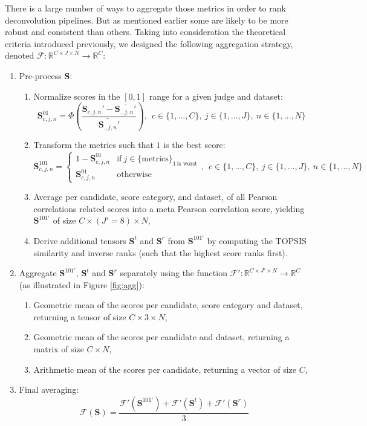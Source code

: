 \documentclass{article}
\begin{document}
There is a large number of ways to aggregate those metrics in order to rank deconvolution pipelines. 
But as mentioned earlier some are likely to be more robust and consistent than others. 
Taking into consideration the theoretical criteria introduced previously, we designed the following aggregation strategy, denoted $\mathcal{F}: \mathbb{R}^{C \times J \times N} \longrightarrow \mathbb{R}^C$:
\begin{enumerate}
    \item Pre-process $\mathbf{S}$:
    \begin{enumerate}
        \item Normalize scores in the $[0, 1]$ range for a given judge and dataset:
        $$\mathbf{S}^{01}_{c,j,n} = \Phi\left(\frac{\mathbf{S}_{c,j,n}' - \overline{\mathbf{S}_{.,j,n}'}}{\widetilde{\mathbf{S}_{.,j,n}'}}\right), ~~c \in \{1,...,C\}, ~j \in \{1,...,J\}, ~n \in \{1,...,N\}$$
        \item Transform the metrics such that $1$ is the best score:
        $$
        \mathbf{S}^{101}_{c,j,n} = 
        \begin{cases}
          1 - \mathbf{S}^{01}_{c,j,n} & \text{if} ~j \in \{\text{metrics}\}_{1 ~\text{is worst}} \\
          \mathbf{S}^{01}_{c,j,n} & \text{otherwise}
        \end{cases}
        , ~~c \in \{1,...,C\}, ~j \in \{1,...,J\}, ~n \in \{1,...,N\}
        $$
        \item Average per candidate, score category, and dataset, of all Pearson correlations related scores into a meta Pearson correlation score, yielding $\mathbf{S}^{101'}$ of size $C \times (J'=8) \times N$,
        \item Derive additional tensors $\mathbf{S}^t$ and $\mathbf{S}^r$ from $\mathbf{S}^{101'}$ by computing the TOPSIS similarity \cite{yoon_1981_topsis} and inverse ranks (such that the highest score ranks first).
    \end{enumerate}
    \item Aggregate $\mathbf{S}^{101'}$, $\mathbf{S}^t$ and $\mathbf{S}^r$ separately using the function $\mathcal{F'}: \mathbb{R}^{C \times J' \times N} \longrightarrow \mathbb{R}^C$ (as illustrated in Figure \ref{fig:agg}):
    \begin{enumerate}
        \item Geometric mean of the scores per candidate, score category and dataset, returning a tensor of size $C \times 3 \times N$,
        \item Geometric mean of the scores per candidate and dataset, returning a matrix of size $C \times N$,
        \item Arithmetic mean of the scores per candidate, returning a vector of size $C$,
    \end{enumerate}
    \item Final averaging:
    $$\mathcal{F}(\mathbf{S}) = \frac{\mathcal{F'}(\mathbf{S}^{101'}) + \mathcal{F'}(\mathbf{S}^t) + \mathcal{F'}(\mathbf{S}^r)}{3}$$
\end{enumerate}
\end{document}
